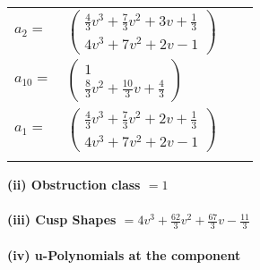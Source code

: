 \documentclass[1p]{elsarticle_modified}
\theoremstyle{definition}
\begin{document}
\begin{tabular}{m{7pt} m{180pt} m{7pt} m{180pt} }
\flushright $a_{2}=$&$\begin{pmatrix}\frac{4}{3} v^3+\frac{7}{3} v^2+3 v+\frac{1}{3}\\4 v^3+7 v^2+2 v-1\end{pmatrix}$ \\
\flushright $a_{10}=$&$\begin{pmatrix}1\\\frac{8}{3} v^2+\frac{10}{3} v+\frac{4}{3}\end{pmatrix}$ \\
\flushright $a_{1}=$&$\begin{pmatrix}\frac{4}{3} v^3+\frac{7}{3} v^2+2 v+\frac{1}{3}\\4 v^3+7 v^2+2 v-1\end{pmatrix}$\\&\end{tabular}
\flushleft \textbf{(ii) Obstruction class $= 1$}\\~\\
\flushleft \textbf{(iii) Cusp Shapes $= 4 v^3+\frac{62}{3} v^2+\frac{67}{3} v-\frac{11}{3}$}\\~\\
\newpage\renewcommand{\arraystretch}{1}
\flushleft \textbf{(iv) u-Polynomials at the component}\newline \\
\end{document}

